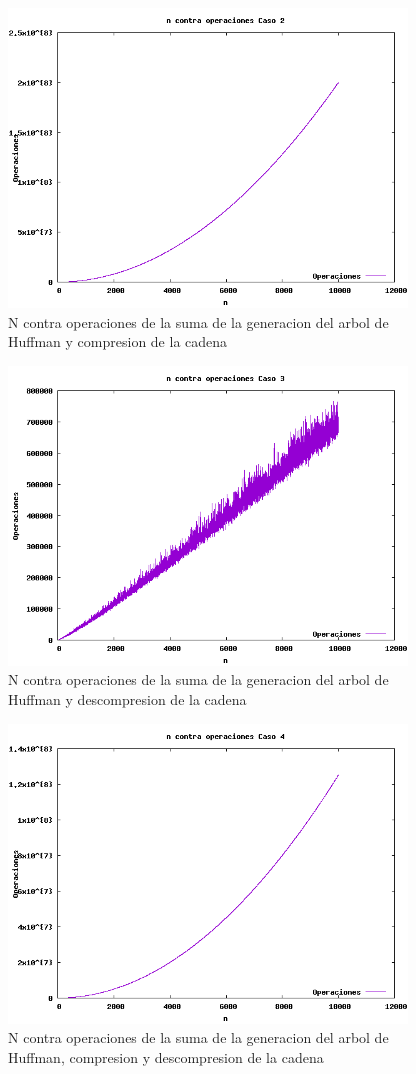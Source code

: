 \documentclass[spanish]{article}
\begin{document}
	\begin{figure}[H]
		\centering
		\includegraphics[width=400px,height=300px]{grafica4}
		\caption{N contra operaciones de la suma de la generacion del arbol de Huffman y compresion de la cadena}
	\end{figure}
	\begin{figure}[H]
		\centering
		\includegraphics[width=400px,height=300px]{grafica5}
		\caption{N contra operaciones de la suma de la generacion del arbol de Huffman y descompresion de la cadena}
	\end{figure}
	\begin{figure}[H]
		\centering
		\includegraphics[width=400px,height=300px]{grafica6}
		\caption{N contra operaciones de la suma de la generacion del arbol de Huffman, compresion y descompresion de la cadena}
	\end{figure}
\end{document}
